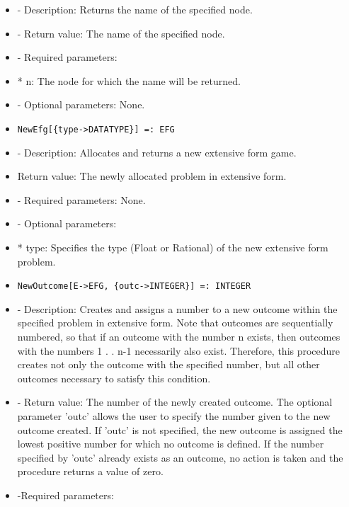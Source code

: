 \begin{itemize}
\bd
\item
- Description:  Returns the name of the specified node.
\item
- Return value:  The name of the specified node.
\item- Required parameters:

\bd
\item
*  n:  The node for which the name will be returned.
\ed

\item
- Optional parameters:  None.
\ed

\item
\begin{verbatim}
NewEfg[{type->DATATYPE}] =: EFG
\end{verbatim}

\bd
\item
- Description:  Allocates and returns a new extensive form game.
\item
 Return value:  The newly allocated problem in extensive form.
\item
- Required parameters:  None.
\item
- Optional parameters: 

\bd
\item
*  type:  Specifies the type (Float or Rational) of the new extensive
form problem.
\ed
\ed

\item
\begin{verbatim}
NewOutcome[E->EFG, {outc->INTEGER}] =: INTEGER
\end{verbatim}

\bd
\item
- Description:  Creates and assigns a number to a new outcome within the
specified problem in extensive form.  Note that outcomes are 
sequentially numbered, so that if an outcome with the number n exists,
then outcomes with the numbers 1 . . n-1 necessarily also exist.
Therefore, this procedure creates not only the outcome with the 
specified number, but all other outcomes necessary to satisfy this 
condition.
\item
- Return value:  The number of the newly created outcome.  The optional 
parameter 'outc' allows the user to specify the number given to the new
outcome created.  If 'outc' is not specified, the new outcome is 
assigned the lowest positive number for which no outcome is defined.  
If the number specified by 'outc' already exists as an outcome, no 
action is taken and the procedure returns a value of zero.
\item
-Required parameters:


\end{itemize}
